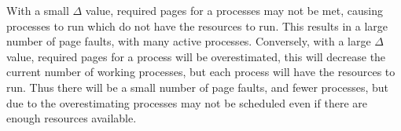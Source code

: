 \documentclass[12pt]{jhwhw}
\begin{document}
	\begin{addmargin}[1em]{}
		With a small $\Delta$ value, required pages for a processes may not be met, causing
		processes to run which do not have the resources to run. This results in a large
		number of page faults, with many active processes.
		\bigbreak
		Conversely, with a large $\Delta$ value, required pages for a process will be overestimated,
		this will decrease the current number of working processes, but each process
		will have the resources to run. Thus there will be a small number of 
		page faults, and fewer processes, but due to the overestimating processes may not be scheduled
		even if there are enough resources available.
	\end{addmargin}
\end{document}
